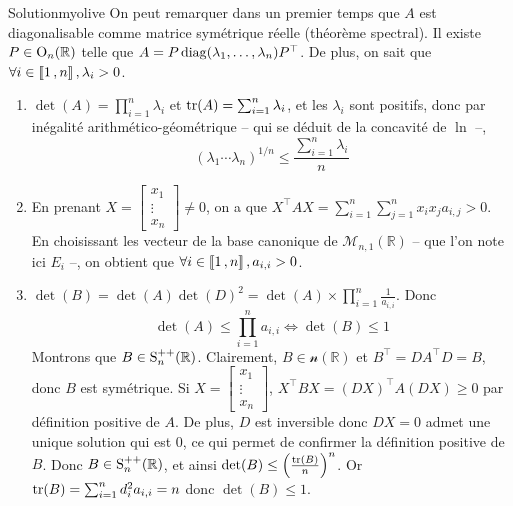     \begin{demo}{Solution}{myolive}
        On peut remarquer dans un premier temps que $A$ est diagonalisable comme matrice symétrique réelle (théorème spectral). Il existe $P \in \operatorname{O}_n(\mathbb{R})$ telle que $A = P \operatorname{diag}(\lambda_1, \ldots, \lambda_n) P^{\top}$. De plus, on sait que $\forall i \in \left\llbracket 1 \, , n \right\rrbracket, \lambda_i > 0$.
        \begin{enumerate}
            \item $\det(A) = \prod_{i=1}^{n} \lambda_i$ et $\operatorname{tr}(A) = \sum_{i=1}^{n} \lambda_i$, et les $\lambda_i$ sont positifs, donc par inégalité arithmético-géométrique -- qui se déduit de la concavité de $\ln$ --, 
            \[ \left(\lambda_1\cdots \lambda_n\right)^{1/n} \leq \frac{\sum_{i=1}^{n} \lambda_i}{n} \]
            \item En prenant $X = \begin{bmatrix}
                x_1 \\
                \vdots \\
                x_n
            \end{bmatrix} \neq 0$, on a que $X^{\top} A X = \sum_{i=1}^{n} \sum_{j=1}^{n} x_i x_j a_{i,j} > 0$. En choisissant les vecteur de la base canonique de $\mathcal{M}_{n,1}(\mathbb{R})$ -- que l’on note ici $E_i$ --, on obtient que $\forall i \in \left\llbracket 1 \, , n \right\rrbracket, a_{i,i} > 0$.
            \item $\det(B) = \det(A) \det(D)^2 = \det(A) \times \prod_{i=1}^{n} \frac{1}{a_{i,i}}$. Donc 
            \[ \det(A) \leq \prod_{i=1}^{n} a_{i,i} \iff \det(B) \leq 1 \]    
            Montrons que $B \in \operatorname{S}_n^{++}(\mathbb{R})$. Clairement, $B \in \mathcal{n}(\mathbb{R})$ et $B^{\top} = D A^{\top} D = B$, donc $B$ est symétrique. Si $X = \begin{bmatrix}
                x_1 \\
                \vdots \\
                x_n
            \end{bmatrix}$, $X^{\top} B X = (DX)^{\top} A (DX) \geq 0$ par définition positive de $A$. De plus, $D$ est inversible donc $DX= 0$ admet une unique solution qui est $0$, ce qui permet de confirmer la définition positive de $B$. Donc $B \in \operatorname{S}_n^{++}(\mathbb{R})$, et ainsi $\operatorname{det}(B) \leq \left(\frac{\operatorname{tr}(B)}{n}\right)^n$. Or $\operatorname{tr}(B) = \sum_{i=1}^{n} d_i^2 a_{i,i} = n$ donc $\det(B) \leq 1$.
        \end{enumerate}
    \end{demo}


